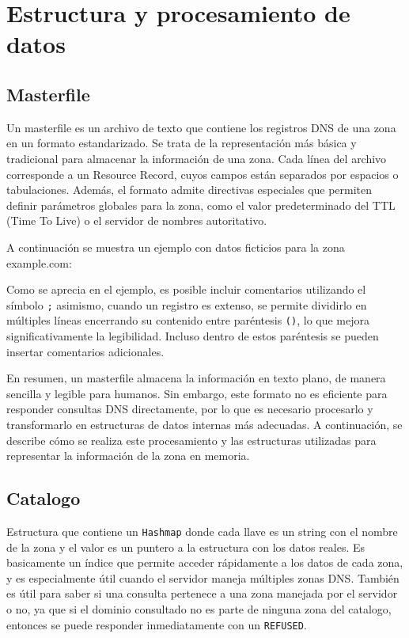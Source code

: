 \chapter{Estructura y procesamiento de datos}

\section{Masterfile}

Un masterfile es un archivo de texto que contiene los registros DNS de una zona en un formato estandarizado. Se trata de la representación más básica y tradicional para almacenar la 
información de una zona. Cada línea del archivo corresponde a un Resource Record, cuyos campos están separados por espacios o tabulaciones. Además, el formato admite directivas especiales 
que permiten definir parámetros globales para la zona, como el valor predeterminado del TTL (Time To Live) o el servidor de nombres autoritativo.

A continuación se muestra un ejemplo con datos ficticios para la zona example.com:





Como se aprecia en el ejemplo, es posible incluir comentarios utilizando el símbolo \texttt{;} asimismo, cuando un registro es extenso, se permite dividirlo en múltiples líneas encerrando 
su contenido entre paréntesis \texttt{()}, lo que mejora significativamente la legibilidad. Incluso dentro de estos paréntesis se pueden insertar comentarios adicionales.

En resumen, un masterfile almacena la información en texto plano, de manera sencilla y legible para humanos. Sin embargo, este formato no es eficiente para responder consultas DNS 
directamente, por lo que es necesario procesarlo y transformarlo en estructuras de datos internas más adecuadas. A continuación, se describe cómo se realiza este procesamiento y las 
estructuras utilizadas para representar la información de la zona en memoria.

\section{Catalogo}\label{sec:catalogo}
Estructura que contiene un \texttt{Hashmap} donde cada llave es un string con el nombre de la zona y el valor es un puntero a la estructura con los datos reales.
Es basicamente un índice que permite acceder rápidamente a los datos de cada zona, y es especialmente útil cuando el servidor maneja múltiples zonas DNS. También
es útil para saber si una consulta pertenece a una zona manejada por el servidor o no, ya que si el dominio consultado no es parte de ninguna
zona del catalogo, entonces se puede responder inmediatamente con un \texttt{REFUSED}.

